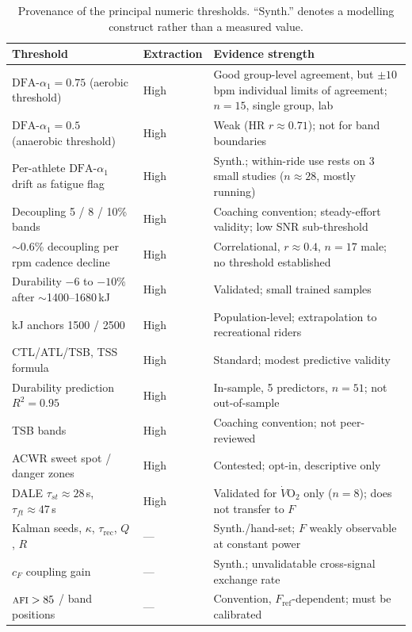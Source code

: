 \documentclass[11pt]{article}
\newcommand{\afi}{\textup{\textsc{afi}}}
\newcommand{\aone}{\ensuremath{\text{DFA-}\alpha_1}}
\newcommand{\Fstate}{\ensuremath{F}}
\begin{document}
\begin{table}[h]
\centering
\footnotesize
\caption{Provenance of the principal numeric thresholds. ``Synth.'' denotes a modelling construct rather than a measured value.}
\label{tab:provenance}
\begin{tabularx}{\linewidth}{@{}l l X@{}}
\toprule
\textbf{Threshold} & \textbf{Extraction} & \textbf{Evidence strength} \\
\midrule
$\aone=0.75$ (aerobic threshold) & High & Good group-level agreement, but $\pm10$\,bpm individual limits of agreement; $n=15$, single group, lab \\
$\aone=0.5$ (anaerobic threshold) & High & Weak (HR $r\approx0.71$); not for band boundaries \\
Per-athlete $\aone$ drift as fatigue flag & High & Synth.; within-ride use rests on 3 small studies ($n\approx28$, mostly running) \\
Decoupling 5 / 8 / 10\% bands & High & Coaching convention; steady-effort validity; low SNR sub-threshold \\
$\sim$0.6\% decoupling per rpm cadence decline & High & Correlational, $r\approx0.4$, $n=17$ male; no threshold established \\
Durability $-6$ to $-10\%$ after $\sim$1400--1680\,kJ & High & Validated; small trained samples \\
kJ anchors 1500 / 2500 & High & Population-level; extrapolation to recreational riders \\
CTL/ATL/TSB, TSS formula & High & Standard; modest predictive validity \\
Durability prediction $R^2=0.95$~\cite{rothschild} & High & In-sample, 5 predictors, $n=51$; not out-of-sample \\
TSB bands & High & Coaching convention; not peer-reviewed \\
ACWR sweet spot / danger zones & High & Contested; opt-in, descriptive only \\
DALE $\tau_{st}\approx28$\,s, $\tau_{ft}\approx47$\,s & High & Validated for $\dot{V}\mathrm{O_2}$ only ($n=8$); does not transfer to $\Fstate$ \\
Kalman seeds, $\kappa$, $\tau_{\text{rec}}$, $Q$, $R$ & --- & Synth./hand-set; $\Fstate$ weakly observable at constant power \\
$c_F$ coupling gain & --- & Synth.; unvalidatable cross-signal exchange rate \\
$\afi>85$ / band positions & --- & Convention, $F_{\text{ref}}$-dependent; must be calibrated \\

\end{tabularx}
\end{table}
\end{document}
